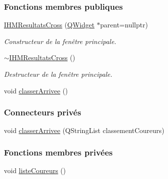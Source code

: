 \subsubsection*{Fonctions membres publiques}
\begin{DoxyCompactItemize}
\item 
\hyperlink{class_i_h_m_resultats_cross_a94afa0356ebc98e497dfecca3e1bb00b}{I\+H\+M\+Resultats\+Cross} (\hyperlink{class_q_widget}{Q\+Widget} $\ast$parent=nullptr)
\begin{DoxyCompactList}\small\item\em Constructeur de la fenêtre principale. \end{DoxyCompactList}\item 
\hyperlink{class_i_h_m_resultats_cross_a62afe926862fddcb340e4a2c57c3cddf}{$\sim$\+I\+H\+M\+Resultats\+Cross} ()
\begin{DoxyCompactList}\small\item\em Destructeur de la fenêtre principale. \end{DoxyCompactList}\item 
void \hyperlink{class_i_h_m_resultats_cross_a4311c35a2869a24be1a06d7410623eda}{classer\+Arrivee} ()
\end{DoxyCompactItemize}
\subsubsection*{Connecteurs privés}
\begin{DoxyCompactItemize}
\item 
void \hyperlink{class_i_h_m_resultats_cross_a5f4a74c4c024aaa9d39050ac176c9e37}{classer\+Arrivee} (Q\+String\+List classement\+Coureurs)
\end{DoxyCompactItemize}
\subsubsection*{Fonctions membres privées}
\begin{DoxyCompactItemize}
\item 
void \hyperlink{class_i_h_m_resultats_cross_a5e8e7f363a93e1e5e6b3c5eb0ad29c28}{liste\+Coureurs} ()
\end{DoxyCompactItemize}
